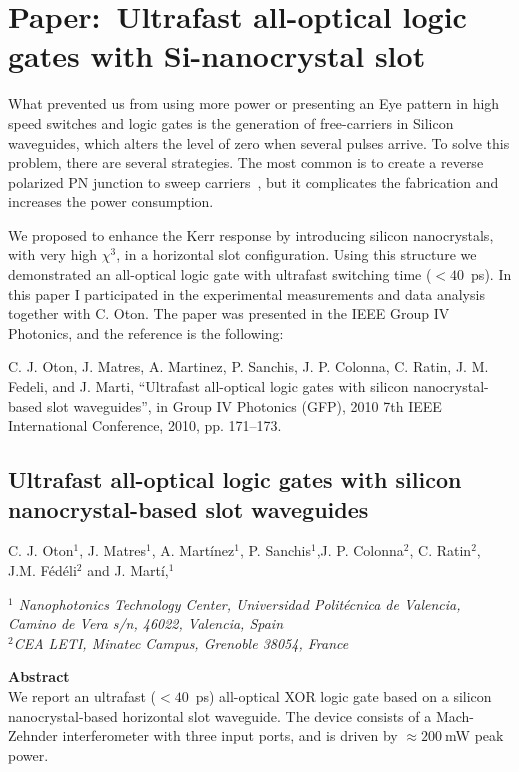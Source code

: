\chapter{Paper:~Ultrafast all-optical logic gates with Si-nanocrystal slot}
\label{ch:paperLogicGates}

What prevented us from using more power or presenting an Eye pattern in high speed switches and logic gates is the generation of free-carriers in Silicon waveguides, which alters the level of zero when several pulses arrive.
To solve this problem, there are several strategies. The most common is to create a reverse polarized PN junction to sweep carriers~\cite{Turner-Foster2010}, but it complicates the fabrication and increases the power consumption.

We proposed to enhance the Kerr response by introducing silicon nanocrystals, with very high $\chi^3$, in a horizontal slot configuration. Using this structure we demonstrated an all-optical logic gate with ultrafast switching time ($<40$~ps). In this paper I participated in the experimental measurements and data analysis together with C. Oton. The paper was presented in the IEEE Group IV Photonics, and the reference is the following:


\vspace{1.5cm}
C. J. Oton, J. Matres, A. Martinez, P. Sanchis, J. P. Colonna, C. Ratin, J. M. Fedeli, and J. Marti, “Ultrafast all-optical logic gates with silicon nanocrystal-based slot waveguides”, in Group IV Photonics (GFP), 2010 7th IEEE International Conference, 2010, pp. 171–173.

\newpage
\begin{center}
\section*{Ultrafast all-optical logic gates with silicon nanocrystal-based slot waveguides}
{C. J. Oton$^{1}$, J. Matres$^{1}$,  A. Mart\'inez$^1$, P. Sanchis$^1$,J. P. Colonna$^2$, C. Ratin$^2$, J.M. F\'ed\'eli$^2$ and J. Mart\'i,$^1$} 
\end{center}

\noindent
\textit{$^1$ Nanophotonics Technology Center, Universidad Polit\'ecnica de Valencia, Camino de Vera s/n, 46022, Valencia, Spain\\
$^2$CEA LETI, Minatec Campus, Grenoble 38054, France}


\textbf{Abstract} \\
\noindent
We report an ultrafast ($<40$~ps) all-optical XOR logic gate based on a silicon nanocrystal-based horizontal slot waveguide.
The device consists of a Mach-Zehnder interferometer with three input ports, and is driven by $\approx 200~$mW peak power.


